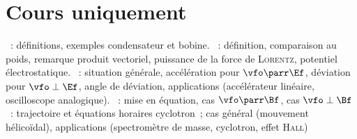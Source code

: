 \documentclass[a4paper, 12pt, final, garamond]{book}
\begin{document}
\section{Cours uniquement}
\begin{enumerate}[label=\Roman*]
	~: définitions, exemples condensateur
	et bobine.
	~: définition, comparaison au poids,
	remarque produit vectoriel, puissance de la force de \textsc{Lorentz},
	potentiel électrostatique.
	~: situation générale, accélération
	pour $\vfo\parr\Ef$, déviation pour $\vfo\perp\Ef$, angle de déviation,
	applications (accélérateur linéaire, oscilloscope analogique).
	~: mise en équation, cas
	$\vfo\parr\Bf$, cas $\vfo\perp\Bf$~: trajectoire et équations horaires
	cyclotron~; cas général (mouvement hélicoïdal), applications
	(spectromètre de masse, cyclotron, effet \textsc{Hall})
\end{enumerate}

\newpage
\end{document}
